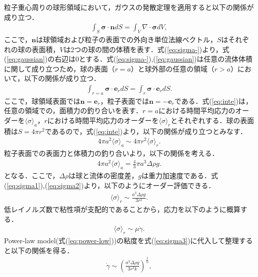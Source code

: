 粒子重心周りの球形領域において，ガウスの発散定理を適用すると以下の関係が成り立つ．
\begin{eqnarray}
    \int_S{\bm{\sigma \cdot \bm{n}}}dS = \int_V{\nabla \cdot \bm{\sigma}}dV ,
    \label{eq:gaussian}
\end{eqnarray}
ここで，$\bm{n}$は球領域および粒子の表面での外向き単位法線ベクトル，$S$はそれぞれの球の表面積，$V$は2つの球の間の体積を表す．式(\ref{eq:sigma-})より，式(\ref{eq:gaussian})の右辺は0とする．式(\ref{eq:sigma-}),(\ref{eq:gaussian})は任意の流体体積に関して成り立つため，球の表面（$r = a$）と球外部の任意の領域（$r > a$）において，以下の関係が成り立つ．
\begin{eqnarray}
    \int_{r=a}\bm{\sigma}\cdot\bm{e}_r dS=\int_r\bm{\sigma}\cdot\bm{e}_r dS .
    \label{eq:inte}
\end{eqnarray}
ここで，球領域表面では$\bm{n} = \bm{e}_r$，粒子表面では$\bm{n}=-\bm{e}_r$である．式(\ref{eq:inte})は，任意の領域での，面積力の釣り合いを表す．$r = a$における時間平均応力のオーダーを$\langle\sigma\rangle_a$，$r$における時間平均応力のオーダーを$\langle\sigma\rangle_r$とそれぞれする．球の表面積は$S=4\pi r^2$であるので，式(\ref{eq:inte})より，以下の関係が成り立つとみなす．
\begin{eqnarray}
    4\pi a^2\langle\sigma\rangle_a \sim 4\pi r^2\langle\sigma\rangle_r .
    \label{eq:sigma1}
\end{eqnarray}
粒子表面での表面力と体積力の釣り合いより，以下の関係を考える．
\begin{eqnarray}
    4\pi a^2\langle\sigma\rangle_a = \frac{4}{3} \pi a^3 \Delta \rho g .
    \label{eq:sigma2}
\end{eqnarray}
となる．ここで，$\Delta \rho$は球と流体の密度差，$g$は重力加速度である．式(\ref{eq:sigma1}),(\ref{eq:sigma2})より，以下のようにオーダー評価できる．
\begin{eqnarray}
    \langle\sigma\rangle_r \sim \frac{a^3\Delta\rho g}{3r^2} .
\end{eqnarray}
低レイノルズ数で粘性項が支配的であることから，応力を以下のように概算する．
\begin{eqnarray}
    \langle\sigma\rangle_r \sim \mu \dot{\gamma} .
    \label{eq:sigma3}
\end{eqnarray}
Power-law model(式(\ref{eq:power-low}))の粘度を式(\ref{eq:sigma3})に代入して整理すると以下の関係を得る．
\begin{eqnarray}
    \dot{\gamma} \sim \left(\frac{a^3\Delta\rho g}{3r^2 k}\right)^{\frac{1}{n}} ,
    \label{eq:gamma_abs}
\end{eqnarray}

